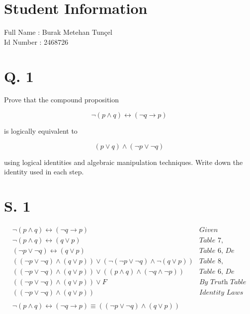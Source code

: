 \documentclass[11pt]{article}
\begin{document}
\section*{Student Information } 
Full Name :  Burak Metehan Tunçel \\
Id Number :  2468726 \\

\section*{Q. 1}
Prove that the compound proposition
\begin{center}
    \begin{equation*}
        \neg(p \land q) \leftrightarrow (\neg q \rightarrow p)
    \end{equation*}
\end{center}
is logically equivalent to
\begin{center}
    \begin{equation*}
        (p \lor q) \land (\neg p \lor \neg q)
    \end{equation*}
\end{center}
using logical identities and algebraic manipulation techniques. Write down the identity used in each step.

\section*{S. 1}
\begin{tcolorbox}
\begin{align*}
		&\neg(p \land q) \leftrightarrow (\neg q \rightarrow p) & \textit{Given}\\
		&\neg(p \land q) \leftrightarrow (q \lor p) & \textit{Table 7, Equation 1 in 1.3}\\
		&(\neg p \lor \neg q) \leftrightarrow (q \lor p) & \textit{Table 6, De Morgan's Law}\\
		&((\neg p \lor \neg q) \land (q \lor p)) \lor (\neg (\neg p \lor \neg q) \land \neg (q \lor p)) & \textit{Table 8, Equation 3 in 1.3}\\
		&((\neg p \lor \neg q) \land (q \lor p)) \lor ((p \land q) \land (\neg q \land \neg p)) & \textit{Table 6, De Morgan's Law}\\
		&((\neg p \lor \neg q) \land (q \lor p)) \lor F & \textit{By Truth Table}\\
		& ((\neg p \lor \neg q) \land (q \lor p)) & \textit{Identity Laws}\\
		& & \\
		& \neg(p \land q) \leftrightarrow (\neg q \rightarrow p) \equiv ((\neg p \lor \neg q) \land (q \lor p))
\end{align*}
\end{tcolorbox}
\end{document}
